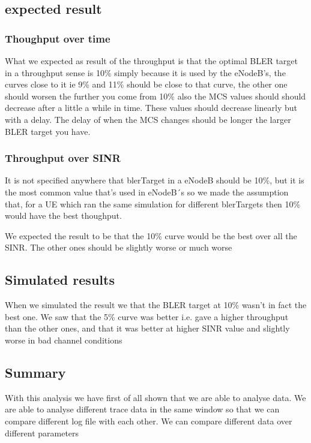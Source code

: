 \documentclass[cropmarks, frame, english]{idamasterthesis}
\begin{document}
\subsection{expected result}

\subsubsection{Thoughput over time}
What we expected as result of the throughput is that the optimal BLER target in a throughput sense is 10\% simply because it is used by the eNodeB's, the curves close to it ie 9\% and 11\% should be close to that curve, the other one should worsen the further you come from 10\% also the MCS values should should decrease after a little a while in time. These values should decrease linearly but with a delay. The delay of when the MCS changes should be longer the larger BLER target you have.


\subsubsection{Throughput over SINR}
It is not specified anywhere that blerTarget in a eNodeB should be 10\%, but it is the most common value that's used in eNodeB´s so we made the assumption that, for a UE which ran the same simulation for different blerTargets then 10\% would have the best thoughput.

We expected the result to be that the 10\% curve would be the best over all the SINR. The other ones should be slightly worse or much worse

\subsection{Simulated results}
When we simulated the result we that the BLER target at 10\% wasn't in fact the best one. We saw that the 5\% curve was better i.e. gave a higher throughput than the other ones, and that it was better at higher SINR value and slightly worse in bad channel conditions

\subsection{Summary}
With this analysis we have first of all shown that we are able to analyse data.
We are able to analyse different trace data in the same window so that we can compare different log file with each other.
We can compare different data over different parameters
\end{document}
